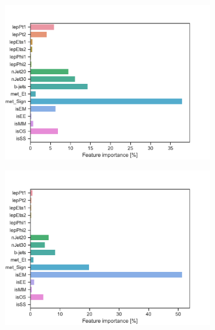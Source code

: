 \begin{figure}[H]
\begin{subfigure}[t!]{0.49\textwidth}
        \includegraphics[width = \textwidth]{Figures/WW/BDT/Low_level/High/featureImportance.pdf}
        \caption{}
        \label{fig:traintestscaled}
    \end{subfigure}
    \begin{subfigure}[t!]{0.49\textwidth}
        \includegraphics[width = \textwidth]{Figures/Mono_Z/ML/BDT/Low_level/High/featureImportance.pdf}
        \caption{}
        \label{fig:ROCBDTLow_low_level}
    \end{subfigure}
    \caption{}
    \label{fig:Non}
\end{figure}

